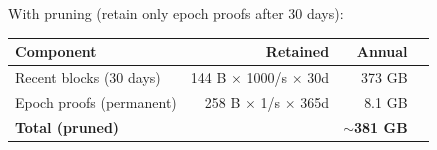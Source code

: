With pruning (retain only epoch proofs after 30 days):

\begin{center}
\begin{tabular}{lrrr}
\toprule
\textbf{Component} & \textbf{Retained} & \textbf{Annual} \\
\midrule
Recent blocks (30 days) & 144 B $\times$ 1000/s $\times$ 30d & 373 GB \\
Epoch proofs (permanent) & 258 B $\times$ 1/s $\times$ 365d & 8.1 GB \\
\midrule
\textbf{Total (pruned)} & & \textbf{$\sim$381 GB} \\
\bottomrule
\end{tabular}
\end{center}

